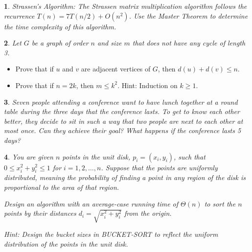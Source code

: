 \documentclass[%
addpoints]{exam}
\theoremstyle{problem}
\newtheorem{p}{}
\begin{document}
\begin{p}
Strassen’s Algorithm: The Strassen matrix multiplication algorithm follows the recurrence \(T(n) = 7T(n/2) + O(n^2)\). Use the Master Theorem to determine the time complexity of this algorithm.  
\hfill\end{p}


\begin{p}
Let \( G \) be a graph of order \( n \) and size \( m \) that does not have any cycle of length 3.
\hfill\end{p}
\begin{itemize}
    \item Prove that if \( u \) and \( v \) are adjacent vertices of \( G \), then \( d(u) + d(v) \leq n \).
    \item Prove that if \( n = 2k \), then \( m \leq k^2 \). Hint: Induction on \( k \geq 1 \).
\end{itemize}

\begin{p}
Seven people attending a conference want to have lunch together at a round table during the three days that the conference lasts. To get to know each other better, they decide to sit in such a way that two people are next to each other at most once. Can they achieve their goal? What happens if the conference lasts 5 days?  
\hfill\end{p}

\begin{p}
You are given \( n \) points in the unit disk, \( p_i = (x_i, y_i) \), such that \( 0 \leq x_i^2 + y_i^2 \leq 1 \) for \( i = 1, 2, \dots, n \). Suppose that the points are uniformly distributed, meaning the probability of finding a point in any region of the disk is proportional to the area of that region.  

Design an algorithm with an average-case running time of \( \Theta(n) \) to sort the \( n \) points by their distances \( d_i = \sqrt{x_i^2 + y_i^2} \) from the origin.  

Hint: Design the bucket sizes in BUCKET-SORT to reflect the uniform distribution of the points in the unit disk.  
\hfill\end{p}
\end{document}
